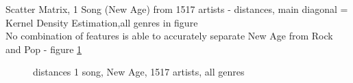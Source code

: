 \noindent Scatter Matrix, 1 Song (New Age) from 1517 artists - distances, main diagonal = Kernel Density Estimation,all genres in figure\\
No combination of features is able to accurately separate New Age from Rock and Pop - figure \ref{fig:corr6}
\begin{figure}[htbp]
	\centering
	\caption{distances 1 song, New Age, 1517 artists, all genres}
	\label{fig:corr6}
\end{figure}
\FloatBarrier

